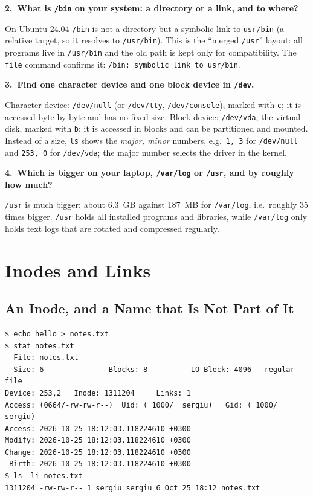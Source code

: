 \documentclass[12pt,a4paper]{article}
\newcommand{\qa}[2]{%
  \par\needspace{5\baselineskip}\medskip
  \noindent\textbf{#1.~#2}\par\smallskip\noindent}
\begin{document}
\qa{2}{What is \texttt{/bin} on your system: a directory or a link, and to where?}
On Ubuntu 24.04 \texttt{/bin} is not a directory but a symbolic link to \texttt{usr/bin} (a relative target, so it resolves to \texttt{/usr/bin}). This is the ``merged \texttt{/usr}'' layout: all programs live in \texttt{/usr/bin} and the old path is kept only for compatibility. The \texttt{file} command confirms it: \texttt{/bin: symbolic link to usr/bin}.

\qa{3}{Find one character device and one block device in \texttt{/dev}.}
Character device: \texttt{/dev/null} (or \texttt{/dev/tty}, \texttt{/dev/console}), marked with \texttt{c}; it is accessed byte by byte and has no fixed size. Block device: \texttt{/dev/vda}, the virtual disk, marked with \texttt{b}; it is accessed in blocks and can be partitioned and mounted. Instead of a size, \texttt{ls} shows the \textit{major, minor} numbers, e.g.\ \texttt{1, 3} for \texttt{/dev/null} and \texttt{253, 0} for \texttt{/dev/vda}; the major number selects the driver in the kernel.

\qa{4}{Which is bigger on your laptop, \texttt{/var/log} or \texttt{/usr}, and by roughly how much?}
\texttt{/usr} is much bigger: about 6.3~GB against 187~MB for \texttt{/var/log}, i.e.\ roughly 35 times bigger. \texttt{/usr} holds all installed programs and libraries, while \texttt{/var/log} only holds text logs that are rotated and compressed regularly.

\newpage
\section{Inodes and Links}

\subsection{An Inode, and a Name that Is Not Part of It}

\begin{lstlisting}[style=terminal,caption={Creating a file and looking at its inode}]
$ echo hello > notes.txt
$ stat notes.txt
  File: notes.txt
  Size: 6               Blocks: 8          IO Block: 4096   regular file
Device: 253,2   Inode: 1311204     Links: 1
Access: (0664/-rw-rw-r--)  Uid: ( 1000/  sergiu)   Gid: ( 1000/  sergiu)
Access: 2026-10-25 18:12:03.118224610 +0300
Modify: 2026-10-25 18:12:03.118224610 +0300
Change: 2026-10-25 18:12:03.118224610 +0300
 Birth: 2026-10-25 18:12:03.118224610 +0300
$ ls -li notes.txt
1311204 -rw-rw-r-- 1 sergiu sergiu 6 Oct 25 18:12 notes.txt
\end{lstlisting}
\end{document}
